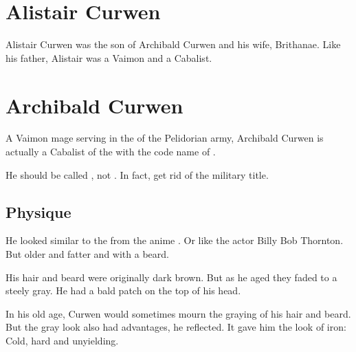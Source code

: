 \section{Alistair Curwen}
Alistair Curwen was the son of Archibald Curwen and his wife, Brithanae. 
Like his father, Alistair was a \Telcra Vaimon and a Cabalist. 















\section{Archibald Curwen}
A \human{} Vaimon mage serving in the \ishrah{} of the Pelidorian army, Archibald Curwen is actually a Cabalist of the  with the code name of . 

% 

He should be called , not . 
In fact, get rid of the military title. 









\subsection{Physique}
He looked similar to the \JimushiJuubei{} from the anime \cite{Anime:Basilisk}. 
Or like the actor Billy Bob Thornton. 
But older and fatter and with a beard. 

His hair and beard were originally dark brown. 
But as he aged they faded to a steely gray. 
He had a bald patch on the top of his head. 

In his old age, Curwen would sometimes mourn the graying of his hair and beard. 
But the gray look also had advantages, he reflected. 
It gave him the look of iron: 
Cold, hard and unyielding. 

